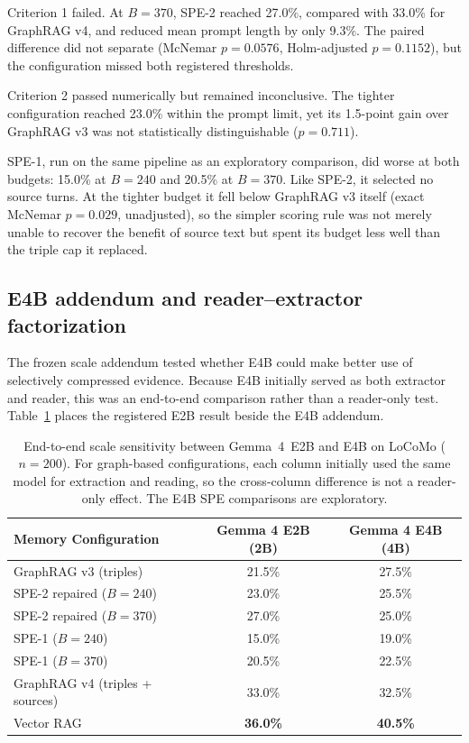 Criterion 1 failed. At $B=370$, SPE-2 reached 27.0\%, compared with 33.0\% for GraphRAG v4, and
reduced mean prompt length by only 9.3\%. The paired difference did not separate (McNemar $p=0.0576$,
Holm-adjusted $p=0.1152$), but the configuration missed both registered thresholds.

Criterion 2 passed numerically but remained inconclusive. The tighter configuration reached 23.0\%
within the prompt limit, yet its 1.5-point gain over GraphRAG v3 was not statistically distinguishable
($p=0.711$).

SPE-1, run on the same pipeline as an exploratory comparison, did worse at both budgets: 15.0\% at
$B=240$ and 20.5\% at $B=370$. Like SPE-2, it selected no source turns. At the tighter budget it fell
below GraphRAG v3 itself (exact McNemar $p=0.029$, unadjusted), so the simpler scoring rule was not
merely unable to recover the benefit of source text but spent its budget less well than the triple cap
it replaced.

\subsection{E4B addendum and reader--extractor factorization}
\label{sec:scale_generalization}

The frozen scale addendum tested whether E4B could make better use of selectively compressed evidence.
Because E4B initially served as both extractor and reader, this was an end-to-end comparison rather
than a reader-only test. Table~\ref{tab:scale_comparison} places the registered E2B result beside the
E4B addendum.

\begin{table}[htbp]
  \centering
  \scriptsize
  \setlength{\tabcolsep}{3pt}
  \begin{tabular}{lcc}
    \toprule
    Memory Configuration & Gemma 4 E2B (2B) & Gemma 4 E4B (4B) \\
    \midrule
    GraphRAG v3 (triples) & 21.5\% & 27.5\% \\
    SPE-2 repaired ($B=240$) & 23.0\% & 25.5\% \\
    SPE-2 repaired ($B=370$)& 27.0\% & 25.0\% \\
    SPE-1 ($B=240$) & 15.0\% & 19.0\% \\
    SPE-1 ($B=370$) & 20.5\% & 22.5\% \\
    GraphRAG v4 (triples + sources) & 33.0\% & 32.5\% \\
    Vector RAG & \textbf{36.0\%} & \textbf{40.5\%} \\
    \bottomrule
  \end{tabular}
  \caption{End-to-end scale sensitivity between Gemma~4~E2B and E4B on LoCoMo ($n=200$). For
           graph-based configurations, each column initially used the same model for extraction and
           reading, so the cross-column difference is not a reader-only effect. The E4B SPE
           comparisons are exploratory.}
  \label{tab:scale_comparison}
\end{table}


